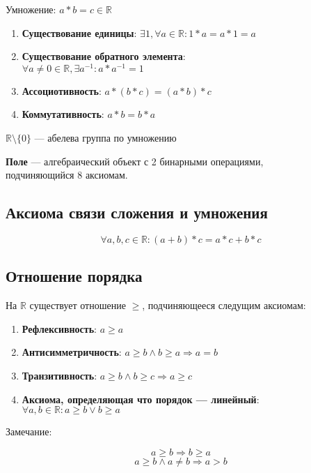 \documentclass{article}
\begin{document}
Умножение: $a * b = c \in \mathbb{R}$

\begin{enumerate}
	\item \textbf{Существование единицы}: $\exists 1, \forall a \in \mathbb{R} : 1 * a = a * 1 = a$
	\item \textbf{Существование обратного элемента}: \\
	$\forall a \ne 0 \in \mathbb{R}, \exists a^{-1} : a * a^{-1} = 1$
	\item \textbf{Ассоциотивность}: $a * (b * c) = (a * b) * c$
	\item \textbf{Коммутативность}: $a * b = b * a$
\end{enumerate}

$\mathbb{R} \setminus \{0\}$ --- абелева группа по умножению

\textbf{Поле} --- алгебраический объект с 2 бинарными операциями, \\
подчиняющийся 8 аксиомам.

\subsection{Аксиома связи сложения и умножения}

\[
\forall a, b, c \in \mathbb{R} : (a + b) * c = a * c + b * c
\]

\subsection{Отношение порядка}

На $\mathbb{R}$ существует отношение $\ge$, подчиняющееся следущим аксиомам:

\begin{enumerate}
	\item \textbf{Рефлексивность}: $a \ge a$
	\item \textbf{Антисимметричность}: $a \ge b \land b \ge a \Rightarrow a = b$
	\item \textbf{Транзитивность}: $a \ge b \land b \ge c \Rightarrow a \ge c$
	\item \textbf{Аксиома, определяющая что порядок --- линейный}: \\
	$\forall a, b \in \mathbb{R} : a \ge b \lor b \ge a$
\end{enumerate}

{\large Замечание:}

\[ a \ge b \Rightarrow b \ge a \]
\[ a \ge b \land a \ne b \Rightarrow a > b \]
\end{document}
